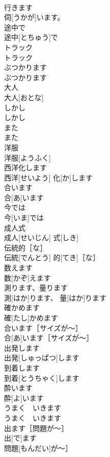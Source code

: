 \documentclass[8pt]{extreport}
\begin{document}
\begin{CJK}{UTF8}{min}
\\	行きます
\\	伺[うかが]います。	
\\	途中で	
\\	途中[とちゅう]で	
\\	トラック	
\\	トラック	
\\	ぶつかります	
\\	ぶつかります	
\\	大人	
\\	大人[おとな]	
\\	しかし	
\\	しかし	
\\	また	
\\	また	
\\	洋服	
\\	洋服[ようふく]	
\\	西洋化します	
\\	西洋[せいよう] 化[か]します	
\\	合います	
\\	合[あ]います	
\\	今では	
\\	今[いま]では	
\\	成人式	
\\	成人[せいじん] 式[しき]	
\\	伝統的［な］	
\\	伝統[でんとう] 的[てき]［な］	
\\	数えます	
\\	数[かぞ]えます	
\\	測ります、量ります	
\\	測[はか]ります、 量[はか]ります	
\\	確かめます	
\\	確[たし]かめます	
\\	合います［サイズが〜］	
\\	合[あ]います［サイズが〜］	
\\	出発します	
\\	出発[しゅっぱつ]します	
\\	到着します	
\\	到着[とうちゃく]します	
\\	酔います	
\\	酔[よ]います	
\\	うまく　いきます	
\\	うまく　いきます	
\\	出ます［問題が〜］	
\\	出[で]ます
\\	問題[もんだい]が〜］	

\end{CJK}
\end{document}
